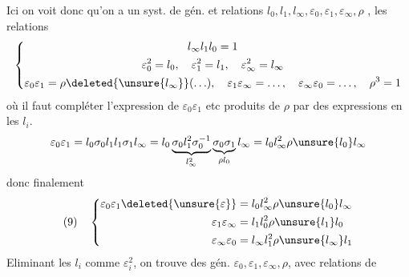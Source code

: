 Ici on voit donc qu'on a un syst. de gén. et relations  $l_0,l_1,l_\infty,\varepsilon_0,\varepsilon_1,\varepsilon_\infty,\rho$ , les relations
\[
\left\{\begin{gathered}
l_\infty l_1l_0=1\\
\varepsilon_0^2=l_0,\quad\varepsilon_1^2=l_1,\quad\varepsilon_\infty^2=l_\infty\\
\varepsilon_0\varepsilon_1=\rho\deleted{\unsure{l_\infty}}(\ldots),\quad\varepsilon_1\varepsilon_\infty=\ldots,\quad\varepsilon_\infty\varepsilon_0=\ldots,\quad\rho^3=1
\end{gathered}\right.
\]
où il faut compléter l'expression de $\varepsilon_0\varepsilon_1$ etc  produits de $\rho$ par des expressions en les $l_i$.
\deleted{\[
\varepsilon_0\varepsilon_1=l_0\sigma_1l_1
\]}
\[
\varepsilon_0\varepsilon_1=l_0\sigma_0l_1l_1\sigma_1l_\infty
=l_0\underbrace{\sigma_0l_1^2\sigma_0^{-1}}_{l_\infty^2}\underbrace{\sigma_0\sigma_1}_{\rho l_0}l_\infty
=l_0l_\infty^2\rho\unsure{l_0}l_\infty
\]
donc finalement
\[
(9)\quad\left\{\begin{aligned}
\varepsilon_0\varepsilon_1\deleted{\unsure{\varepsilon}}&=l_0l_\infty^2\rho\unsure{l_0}l_\infty\\
\varepsilon_1\varepsilon_\infty&=l_1l_0^2\rho\unsure{l_1}l_0\\
\varepsilon_\infty\varepsilon_0&=l_\infty l_1^2\rho\unsure{l_\infty}l_1
\end{aligned}\right.
\]
Eliminant les $l_i$ comme $\varepsilon_i^2$, on trouve des gén. $\varepsilon_0,\varepsilon_1,\varepsilon_\infty,\rho$, avec relations de 

